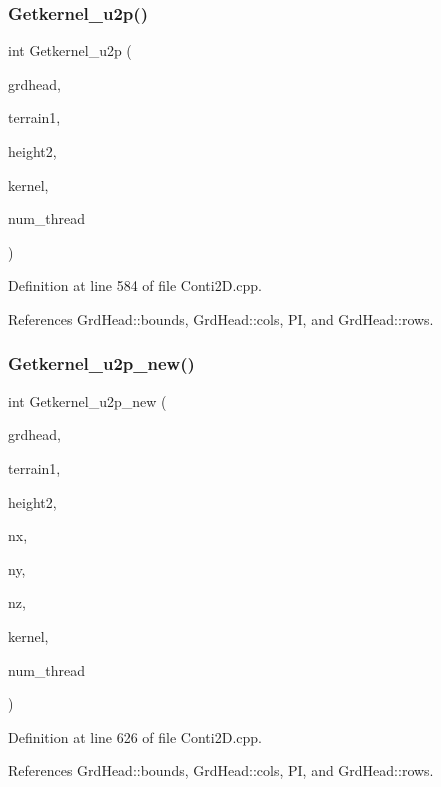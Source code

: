 \subsubsection{Getkernel\+\_\+u2p()}
{\footnotesize\ttfamily int Getkernel\+\_\+u2p (\begin{DoxyParamCaption}\item[{\textbf{ Grd\+Head}}]{grdhead,  }\item[{double $\ast$}]{terrain1,  }\item[{double}]{height2,  }\item[{double $\ast$$\ast$}]{kernel,  }\item[{int}]{num\+\_\+thread }\end{DoxyParamCaption})}



Definition at line 584 of file Conti2\+D.\+cpp.



References Grd\+Head\+::bounds, Grd\+Head\+::cols, PI, and Grd\+Head\+::rows.

\mbox{\label{Conti2D_8h_aa99f45e33c5a1a8c605bbd31056347c7_aa99f45e33c5a1a8c605bbd31056347c7}} 
\subsubsection{Getkernel\+\_\+u2p\+\_\+new()}
{\footnotesize\ttfamily int Getkernel\+\_\+u2p\+\_\+new (\begin{DoxyParamCaption}\item[{\textbf{ Grd\+Head}}]{grdhead,  }\item[{double $\ast$}]{terrain1,  }\item[{double}]{height2,  }\item[{double $\ast$}]{nx,  }\item[{double $\ast$}]{ny,  }\item[{double $\ast$}]{nz,  }\item[{double $\ast$$\ast$}]{kernel,  }\item[{int}]{num\+\_\+thread }\end{DoxyParamCaption})}



Definition at line 626 of file Conti2\+D.\+cpp.



References Grd\+Head\+::bounds, Grd\+Head\+::cols, PI, and Grd\+Head\+::rows.

